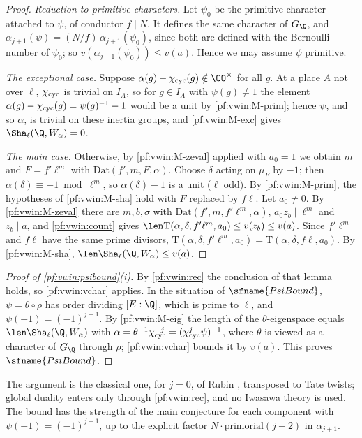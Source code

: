 \begin{proof}
\emph{Reduction to primitive characters.} Let $\psi_0$ be the primitive character attached to $\psi$, of conductor $f\mid N$. It defines the same
character of $G_\Q$, and $\alpha_{j+1}(\psi)=(N/f)\,\alpha_{j+1}(\psi_0)$, since both are defined with the Bernoulli number of $\psi_0$; so
$v(\alpha_{j+1}(\psi_0))\le v(a)$. Hence we may assume $\psi$ primitive.

\emph{The exceptional case.} Suppose $\alpha(g)-\vwincyc(g)\notin\OO^\times$ for all $g$. At a place $A$ not over $\ell$, $\chi_{\mathrm{cyc}}$ is trivial on
$I_A$, so for $g\in I_A$ with $\psi(g)\ne1$ the element $\alpha(g)-\chi_{\mathrm{cyc}}(g)=\psi(g)^{-1}-1$ would be a unit by \ref{pf:vwin:M-prim}; hence
$\psi$, and so $\alpha$, is trivial on these inertia groups, and \ref{pf:vwin:M-exc} gives $\Sha_\ell(\Q,W_\alpha)=0$.

\emph{The main case.} Otherwise, by \ref{pf:vwin:M-zeval} applied with $a_0=1$ we obtain $m$ and $F=f'\ell^m$ with $\mathrm{Dat}(f',m,F,\alpha)$. Choose
$\delta$ acting on $\mu_F$ by $-1$; then $\alpha(\delta)\equiv-1\bmod\ell^m$, so $\alpha(\delta)-1$ is a unit ($\ell$ odd). By \ref{pf:vwin:M-prim}, the
hypotheses of \ref{pf:vwin:M-sha} hold with $F$ replaced by $f\ell$. Let $a_0\ne0$. By \ref{pf:vwin:M-zeval} there are $m,b,\sigma$ with
$\mathrm{Dat}(f',m,f'\ell^m,\alpha)$, $a_0z_b\mid\ell^m$ and $z_b\mid a$, and \cref{pf:vwin:count} gives
$\len\mathrm{T}(\alpha,\delta,f'\ell^m,a_0)\le v(z_b)\le v(a)$. Since $f'\ell^m$ and $f\ell$ have the same prime divisors, $\mathrm{T}(\alpha,\delta,
f'\ell^m,a_0)=\mathrm{T}(\alpha,\delta,f\ell,a_0)$. By \ref{pf:vwin:M-sha}, $\len\Sha_\ell(\Q,W_\alpha)\le v(a)$.
\end{proof}

\begin{proof}[Proof of \cref{pf:vwin:psibound}(i)]
By \cref{pf:vwin:rec} the conclusion of that lemma holds, so \cref{pf:vwin:vchar} applies. In the situation of $\sfname{PsiBound}$,
$\psi=\theta\circ\rho$ has order dividing $[E:\Q]$, which is prime to $\ell$, and $\psi(-1)=(-1)^{j+1}$. By \ref{pf:vwin:M-eig} the length of the
$\theta$-eigenspace equals $\len\Sha_\ell(\Q,W_\alpha)$ with $\alpha=\theta^{-1}\chi_{\mathrm{cyc}}^{-j}=(\chi_{\mathrm{cyc}}^j\psi)^{-1}$, where $\theta$ is viewed as a
character of $G_\Q$ through $\rho$; \cref{pf:vwin:vchar} bounds it by $v(a)$. This proves $\sfname{PsiBound}$.
\end{proof}

\begin{remark}\label{pf:vwin:rem-minus}
The argument is the classical one, for $j=0$, of Rubin \cite{Rubin1990}, transposed to Tate twists; global duality enters only through
\cref{pf:vwin:rec}, and no Iwasawa theory is used. The bound has the strength of the main conjecture \cite{MazurWiles1984} for each component
with $\psi(-1)=(-1)^{j+1}$, up to the explicit factor $N\cdot\mathrm{primorial}(j+2)$ in $\alpha_{j+1}$.
\end{remark}

